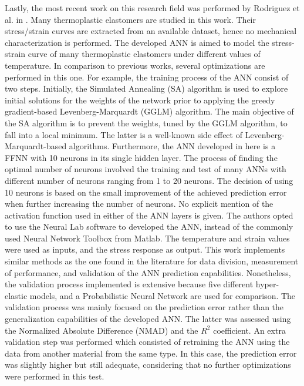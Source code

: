 Lastly, the most recent work on this research field was performed by Rodriguez et al. in \cite{rodriguez2019application}. Many thermoplastic elastomers are studied in this work. Their stress/strain curves are extracted from an available dataset, hence no mechanical characterization is performed. The developed ANN is aimed to model the stress-strain curve of many thermoplastic elastomers under different values of temperature. In comparison to previous works, several optimizations are performed in this one. For example, the training process of the ANN consist of two steps. Initially, the Simulated Annealing (SA) algorithm is used to explore initial solutions for the weights of the network prior to applying the greedy gradient-based Levenberg-Marquardt (GGLM) algorithm. The main objective of the SA algorithm is to prevent the weights, tuned by the GGLM algorithm, to fall into a local minimum. The latter is a well-known side effect of Levenberg-Marquardt-based algorithms. Furthermore, the ANN developed in here is a FFNN with 10 neurons in its single hidden layer. The process of finding the optimal number of neurons involved the training and test of many ANNs with different number of neurons ranging from 1 to 20 neurons. The decision of using 10 neurons is based on the small improvement of the achieved prediction error when further increasing the number of neurons. No explicit mention of the activation function used in either of the ANN layers is given. The authors opted to use the Neural Lab software to developed the ANN, instead of the commonly used Neural Network Toolbox from Matlab\textregistered{}. The temperature and strain values were used as inputs, and the stress response as output. This work implements similar methods as the one found in the literature for data division, measurement of performance, and validation of the ANN prediction capabilities. Nonetheless, the validation process implemented is extensive because five different hyper-elastic models, and a Probabilistic Neural Network are used for comparison. The validation process was mainly focused on the prediction error rather than the generalization capabilities of the developed ANN. The latter was assessed using the Normalized Absolute Difference (NMAD) and the $R^2$ coefficient. An extra validation step was performed which consisted of retraining the ANN using the data from another material from the same type. In this case, the prediction error was slightly higher but still adequate, considering that no further optimizations were performed in this test.

